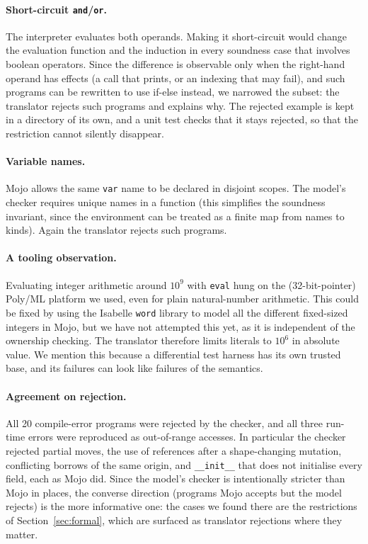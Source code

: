 \documentclass[11pt,a4paper]{article}
\newcommand{\code}[1]{\texttt{#1}}
\begin{document}
\paragraph{Short-circuit \code{and}/\code{or}.}
The interpreter evaluates both operands. Making it short-circuit would change the
evaluation function and the induction in every soundness case that involves
boolean operators. Since the difference is observable only when the right-hand
operand has effects (a call that prints, or an indexing that may fail),
and such programs can be rewritten to use if-else instead, we
narrowed the subset: the translator rejects such programs and explains why. The
rejected example is kept in a directory of its own, and a unit test checks that it
stays rejected, so that the restriction cannot silently disappear.

\paragraph{Variable names.}
Mojo allows the same \code{var} name to be declared in disjoint scopes. The
model's checker requires unique names in a function (this simplifies the
soundness invariant, since the environment can be treated as a finite map from
names to kinds). Again the translator rejects such programs.

\paragraph{A tooling observation.}
Evaluating integer arithmetic around $10^9$ with \code{eval} hung on the
(32-bit-pointer) Poly/ML platform we used, even for plain natural-number
arithmetic.  This could be fixed by using the Isabelle \texttt{word} library
to model all the different fixed-sized integers in Mojo, but we have not
attempted this yet, as it is independent of the ownership checking.
The translator therefore limits literals to $10^6$ in absolute value.
We mention this because a differential test harness has its own trusted base,
and its failures can look like failures of the semantics.

\paragraph{Agreement on rejection.}
All 20 compile-error programs were rejected by the checker, and all three
run-time errors were reproduced as out-of-range accesses. In particular the
checker rejected partial moves, the use of references after a shape-changing
mutation, conflicting borrows of the same origin, and \code{\_\_init\_\_} that
does not initialise every field, each as Mojo did. Since the model's checker is
intentionally stricter than Mojo in places, the converse direction (programs
Mojo accepts but the model rejects) is the more informative one: the cases we
found there are the restrictions of Section~\ref{sec:formal}, which are surfaced
as translator rejections where they matter.
\end{document}
